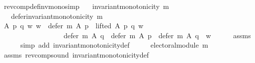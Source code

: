 \begin{isabellebody}
\isamarkupfalse%
%
\endisatagproof
{\isafoldproof}%
%
\isadelimproof
\isanewline
%
\endisadelimproof
\isanewline
\isanewline
{}\isamarkupfalse%
\ rev{\isacharunderscore}{\kern0pt}comp{\isacharunderscore}{\kern0pt}def{\isacharunderscore}{\kern0pt}inv{\isacharunderscore}{\kern0pt}mono{\isacharbrackleft}{\kern0pt}simp{\isacharbrackright}{\kern0pt}{\isacharcolon}{\kern0pt}\isanewline
\ \ \ {\isachardoublequoteopen}invariant{\isacharunderscore}{\kern0pt}monotonicity\ m{\isachardoublequoteclose}\isanewline
\ \ \ {\isachardoublequoteopen}defer{\isacharunderscore}{\kern0pt}invariant{\isacharunderscore}{\kern0pt}monotonicity\ {\isacharparenleft}{\kern0pt}m{\isasymdown}{\isacharparenright}{\kern0pt}{\isachardoublequoteclose}\isanewline
%
\isadelimproof
%
\endisadelimproof
%
\isatagproof
{}\isamarkupfalse%
\ {\isacharminus}{\kern0pt}\isanewline
\ \ \isamarkupfalse%
\ {\isachardoublequoteopen}{\isasymforall}A\ p\ q\ w{\isachardot}{\kern0pt}\ {\isacharparenleft}{\kern0pt}w\ {\isasymin}\ defer\ {\isacharparenleft}{\kern0pt}m{\isasymdown}{\isacharparenright}{\kern0pt}\ A\ p\ {\isasymand}\ lifted\ A\ p\ q\ w{\isacharparenright}{\kern0pt}\ {\isasymlongrightarrow}\isanewline
\ \ \ \ \ \ \ \ \ \ \ \ \ \ \ \ \ \ {\isacharparenleft}{\kern0pt}defer\ {\isacharparenleft}{\kern0pt}m{\isasymdown}{\isacharparenright}{\kern0pt}\ A\ q\ {\isacharequal}{\kern0pt}\ defer\ {\isacharparenleft}{\kern0pt}m{\isasymdown}{\isacharparenright}{\kern0pt}\ A\ p\ {\isasymor}\ defer\ {\isacharparenleft}{\kern0pt}m{\isasymdown}{\isacharparenright}{\kern0pt}\ A\ q\ {\isacharequal}{\kern0pt}\ {\isacharbraceleft}{\kern0pt}w{\isacharbraceright}{\kern0pt}{\isacharparenright}{\kern0pt}{\isachardoublequoteclose}\isanewline
\ \ \ \ \isamarkupfalse%
\ assms\isanewline
\ \ \ \ \isamarkupfalse%
\ {\isacharparenleft}{\kern0pt}simp\ add{\isacharcolon}{\kern0pt}\ invariant{\isacharunderscore}{\kern0pt}monotonicity{\isacharunderscore}{\kern0pt}def{\isacharparenright}{\kern0pt}\isanewline
\ \ \isamarkupfalse%
\ \isamarkupfalse%
\ {\isachardoublequoteopen}electoral{\isacharunderscore}{\kern0pt}module\ {\isacharparenleft}{\kern0pt}m{\isasymdown}{\isacharparenright}{\kern0pt}{\isachardoublequoteclose}\isanewline
\ \ \ \ \isamarkupfalse%
\ assms\ rev{\isacharunderscore}{\kern0pt}comp{\isacharunderscore}{\kern0pt}sound\ invariant{\isacharunderscore}{\kern0pt}monotonicity{\isacharunderscore}{\kern0pt}def\isanewline
\ \ \ \ \isamarkupfalse%

\end{isabellebody}
